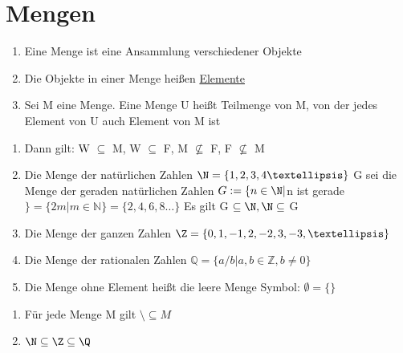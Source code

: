 \chapter{Mengen}
\Def
\begin{enumerate}
\item Eine Menge ist eine Ansammlung verschiedener Objekte
\item Die Objekte in einer Menge heißen \underline{Elemente}\\
%
%
\item Sei M eine Menge. Eine Menge U heißt Teilmenge von M, von der jedes Element von U auch Element von M ist\\
%
\end{enumerate}
%
\begin{enumerate}
\item {
Dann gilt: W $\subseteq$ M, W $\subseteq$ F, M ${\not\subseteq}$ F, F ${\not\subseteq}$ M}
\item {Die Menge der natürlichen Zahlen
$\N = \{1,2,3,4 …\}$
G sei die Menge der geraden natürlichen Zahlen
$G := \{n \in \N | $n ist gerade$\} = \{2m | m \in \mathds{N}\} = \{2,4,6,8 …\}$
Es gilt G $\subseteq \N, \N \subseteq$ G}
\item {Die Menge der ganzen Zahlen
$\Z = \{0,1,-1,2,-2,3,-3, …\}$}
\item {Die Menge der rationalen Zahlen
$\mathds{Q} = \{a/b | a, b \in \mathds{Z}, b \neq 0\}$}
\item {Die Menge ohne Element heißt die leere Menge
Symbol: $\emptyset = \{\}$}
\end{enumerate}
%
\bem
\begin{enumerate}
\item Für jede Menge M gilt $\setminus \subseteq M$
\item $\N \subseteq \Z \subseteq \Q$
\end{enumerate}

